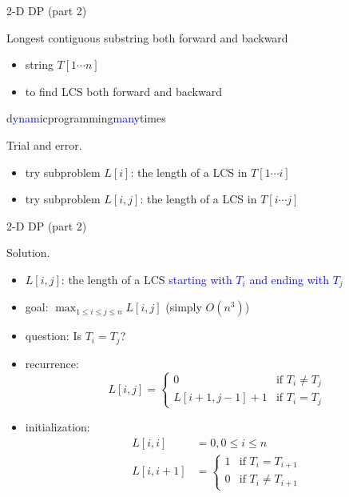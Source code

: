 \begin{frame}{2-D DP (part 2)}
  \begin{exampleblock}{Longest contiguous substring both forward and backward }
    \begin{itemize}
      \item string $T[1 \cdots n]$
      \item to find LCS both forward and backward
    \end{itemize}

    \begin{center}
      d\textcolor{blue}{ynam}icprogramming\textcolor{blue}{many}times
    \end{center}
  \end{exampleblock}

  \begin{alertblock}{Trial and error.}
    \begin{itemize}
      \item try subproblem $L[i]$: the length of a LCS in $T[1 \cdots i]$
      \item try subproblem $L[i,j]$: the length of a LCS in $T[i \cdots j]$
    \end{itemize}
  \end{alertblock}
\end{frame}
\begin{frame}{2-D DP (part 2)}
  \begin{block}{Solution.}
    \begin{itemize}
      \item $L[i,j]$: the length of a LCS \textcolor{blue}{starting with $T_{i}$ and ending with $T_{j}$}
      \item goal: $\max_{1 \le i \le j \le n} L[i,j]$ (simply $O(n^3)$)
      \item<2-> question: Is $T_{i} = T_{j}$?
      \item<2-> recurrence: 
	\begin{displaymath}
	  L[i,j] = \left\{ \begin{array}{ll}
	    0 & \textrm{if $T_{i} \neq T_{j}$}  \\
	    L[i+1,j-1] + 1 & \textrm{if $T_{i} = T_{j}$}
	  \end{array} \right.
	\end{displaymath}
      \item<3-> initialization: 
	\begin{align*}
	  L[i,i] &= 0, 0 \le i \le n  \\
	  L[i,i+1] &= \left\{ \begin{array}{ll}
	    1 & \text{if } T_{i} = T_{i+1}  \\
	    0 & \text{if } T_{i} \neq T_{i+1}
	    \end{array} \right.
	\end{align*}
    \end{itemize}
  \end{block}
\end{frame}
